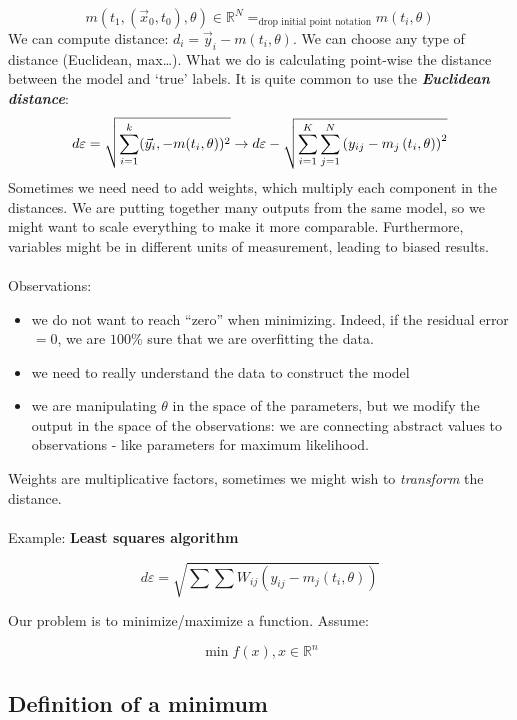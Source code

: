 $$m\left(t_1,\left(\vec{x}_0, t_0\right), \theta\right) \in \mathbb{R}^{N} =_{\text{drop initial point notation}} m(t_i,\theta)$$
\noindent
We can compute distance: $d_i=\vec{y}_i-m(t_i, \theta)$.
\noindent
We can choose any type of distance (Euclidean, max\ldots). What we do is
calculating point-wise the distance between the model and `true' labels.
It is quite common to use the \textbf{\emph{Euclidean distance}}:
$$d \varepsilon =\sqrt{\sum_{i=1}^k(\vec{y}_i,-m(t_i, \theta))^2}\\
\rightarrow d{\varepsilon}-\sqrt{\sum_{i=1}^{K} \sum_{j=1}^{N} \left(y_{ij}-m_j\left(t_i, \theta\right)\right)^2}$$
\noindent
Sometimes we need need to add weights, which multiply each component in
the distances. We are putting together many outputs from the same model,
so we might want to scale everything to make it more comparable.
Furthermore, variables might be in different units of measurement,
leading to biased results.
\\
\\
\noindent
Observations:

\begin{itemize}
\tightlist
\item
  we do not want to reach ``zero'' when minimizing. Indeed, if the
  residual error $=0$, we are $100 \%$ sure that we are overfitting the
  data.
\item
  we need to really understand the data to construct the model
\item
  we are manipulating $\theta$ in the space of the parameters, but we
  modify the output in the space of the observations: we are connecting
  abstract values to observations - like parameters for maximum
  likelihood.
\end{itemize}

\noindent
Weights are multiplicative factors, sometimes we might wish to
\emph{transform} the distance.
\\
\\
\noindent
Example:  \textbf{Least squares algorithm}

$$d{\varepsilon}=\sqrt{\sum \sum W_{ij}\left(y_{ij}-m_j\left(t_i, \theta\right)\right)}$$

\noindent
Our problem is to minimize/maximize a function. Assume:

$$
\min f(x), x \in \mathbb{R}^n
$$

\subsection{Definition of a minimum}

